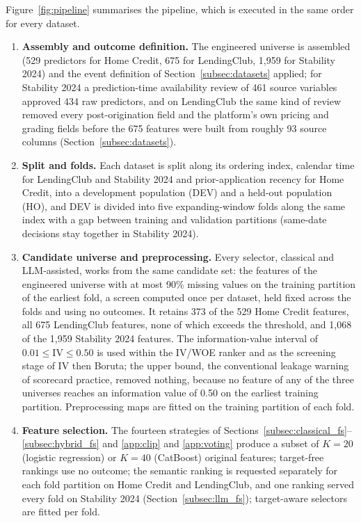 \documentclass[final,5p,twocolumn]{elsarticle}
\newcommand{\Kfeat}{K}
\begin{document}
Figure~\ref{fig:pipeline} summarises the pipeline, which is executed in the same order for every dataset.
\begin{enumerate}
    \item \textbf{Assembly and outcome definition.} The engineered universe is assembled (529 predictors for Home Credit, 675 for LendingClub, 1,959 for Stability 2024) and the event definition of Section~\ref{subsec:datasets} applied; for Stability 2024 a prediction-time availability review of 461 source variables approved 434 raw predictors, and on LendingClub the same kind of review removed every post-origination field and the platform's own pricing and grading fields before the 675 features were built from roughly 93 source columns (Section~\ref{subsec:datasets}).
    \item \textbf{Split and folds.} Each dataset is split along its ordering index, calendar time for LendingClub and Stability 2024 and prior-application recency for Home Credit, into a development population (DEV) and a held-out population (HO), and DEV is divided into five expanding-window folds along the same index with a gap between training and validation partitions (same-date decisions stay together in Stability 2024).
    \item \textbf{Candidate universe and preprocessing.} Every selector, classical and LLM-assisted, works from the same candidate set: the features of the engineered universe with at most 90\% missing values on the training partition of the earliest fold, a screen computed once per dataset, held fixed across the folds and using no outcomes. It retains 373 of the 529 Home Credit features, all 675 LendingClub features, none of which exceeds the threshold, and 1,068 of the 1,959 Stability 2024 features. The information-value interval of $0.01\le\mathrm{IV}\le0.50$ is used within the IV/WOE ranker and as the screening stage of IV then Boruta; the upper bound, the conventional leakage warning of scorecard practice, removed nothing, because no feature of any of the three universes reaches an information value of 0.50 on the earliest training partition. Preprocessing maps are fitted on the training partition of each fold.
    \item \textbf{Feature selection.} The fourteen strategies of Sections~\ref{subsec:classical_fs}--\ref{subsec:hybrid_fs} and \ref{app:clip} and \ref{app:voting} produce a subset of $\Kfeat=20$ (logistic regression) or $\Kfeat=40$ (CatBoost) original features; target-free rankings use no outcome; the semantic ranking is requested separately for each fold partition on Home Credit and LendingClub, and one ranking served every fold on Stability 2024 (Section~\ref{subsec:llm_fs}); target-aware selectors are fitted per fold.

\end{enumerate}
\end{document}
